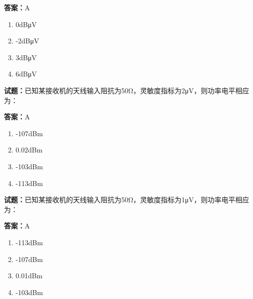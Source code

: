 \documentclass{ctexbook}
\begin{document}
\textbf{答案：}A 

\begin{enumerate}[leftmargin=3em]
  \item 0dBμV 

  \item -2dBμV 

  \item 3dBμV 

  \item 6dBμV 

\end{enumerate}





\vspace{1em}

\textbf{试题：}已知某接收机的天线输入阻抗为50Ω，灵敏度指标为2μV，则功率电平相应为： 

\textbf{答案：}A 

\begin{enumerate}[leftmargin=3em]
  \item -107dBm 

  \item 0.02dBm 

  \item -103dBm 

  \item -113dBm 

\end{enumerate}





\vspace{1em}

\textbf{试题：}已知某接收机的天线输入阻抗为50Ω，灵敏度指标为1μV，则功率电平相应为： 

\textbf{答案：}A 

\begin{enumerate}[leftmargin=3em]
  \item -113dBm 

  \item -107dBm 

  \item 0.01dBm 

  \item -103dBm 

\end{enumerate}
\end{document}
